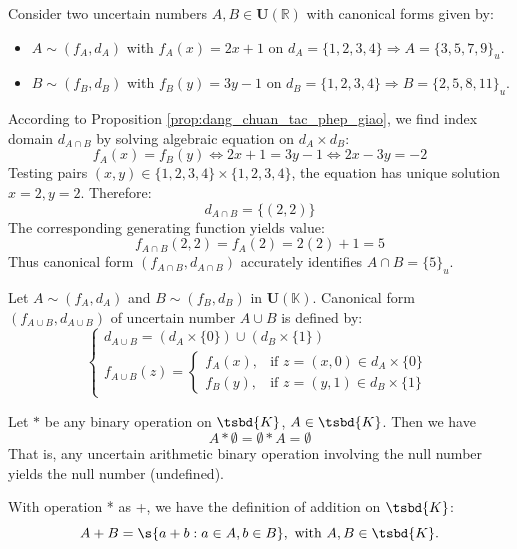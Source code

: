 \begin{example}
	Consider two uncertain numbers $A, B \in \mathbf{U}(\mathbb{R})$ with canonical forms given by:
	\begin{itemize}
		\item $A \sim (f_A, d_A)$ with $f_A(x) = 2x + 1$ on $d_A = \{1, 2, 3, 4\} \Rightarrow A = \{3, 5, 7, 9\}_u$.
		\item $B \sim (f_B, d_B)$ with $f_B(y) = 3y - 1$ on $d_B = \{1, 2, 3, 4\} \Rightarrow B = \{2, 5, 8, 11\}_u$.
	\end{itemize}
	
	According to Proposition \ref{prop:dang_chuan_tac_phep_giao}, we find index domain $d_{A \cap B}$ by solving algebraic equation on $d_A \times d_B$:
	\[
	f_A(x) = f_B(y) \iff 2x + 1 = 3y - 1 \iff 2x - 3y = -2
	\]
	Testing pairs $(x, y) \in \{1, 2, 3, 4\} \times \{1, 2, 3, 4\}$, the equation has unique solution $x = 2, y = 2$. Therefore:
	\[
	d_{A \cap B} = \{(2, 2)\}
	\]
	The corresponding generating function yields value:
	\[
	f_{A \cap B}(2, 2) = f_A(2) = 2(2) + 1 = 5
	\]
	Thus canonical form $(f_{A \cap B}, d_{A \cap B})$ accurately identifies $A \cap B = \{5\}_u$.
\end{example}
\begin{proposition}
	Let $A \sim (f_A, d_A)$ and $B \sim (f_B, d_B)$ in $\mathbf{U}(\mathbb{K})$. Canonical form $(f_{A \cup B}, d_{A \cup B})$ of uncertain number $A \cup B$ is defined by:
	\[
	\begin{cases}
		d_{A \cup B} = (d_A \times \{0\}) \cup (d_B \times \{1\}) \\[1ex]
		f_{A \cup B}(z) = \begin{cases} 
			f_A(x), & \text{if } z = (x, 0) \in d_A \times \{0\} \\[1ex]
			f_B(y), & \text{if } z = (y, 1) \in d_B \times \{1\}
		\end{cases}
	\end{cases}
	\]
\end{proposition}
\begin{theorem}[Undefinedness]
	Let $*$ be any binary operation on $\tsbd{K}$, $A \in \tsbd{K}$. Then we have \[A * \emptyset = \emptyset * A= \emptyset\]
	That is, any uncertain arithmetic binary operation involving the null number yields the null number (undefined).
\end{theorem}
\begin{example}
	With operation * as +, we have the definition of addition on $\tsbd{K}$:
	$$A + B = \s{a+b : a \in A , b \in B}, \text{ with } A,B \in \tsbd{K}.$$
\end{example}

